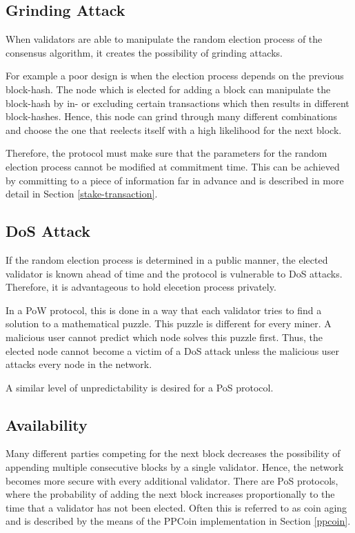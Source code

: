 \subsection{Grinding Attack}
When validators are able to manipulate the random election process of the consensus algorithm, it creates the possibility of grinding attacks. 

For example a poor design is when the election process depends on the previous block-hash. The node which is elected for adding a block can manipulate the block-hash by in- or excluding certain transactions which then results in different block-hashes. Hence, this node can grind through many different combinations and choose the one that reelects itself with a high likelihood for the next block.

Therefore, the protocol must make sure that the parameters for the random election process cannot be modified at commitment time. This can be achieved by committing to a piece of information far in advance and is described in more detail in Section \ref{stake-transaction}.

\subsection{DoS Attack}
If the random election process is determined in a public manner, the elected validator is known ahead of time and the protocol is vulnerable to DoS attacks. Therefore, it is advantageous to hold elecetion process privately. 

In a PoW protocol, this is done in a way that each validator tries to find a solution to a mathematical puzzle. This puzzle is different for every miner. A malicious user cannot predict which node solves this puzzle first. Thus, the elected node cannot become a victim of a DoS attack unless the malicious user attacks every node in the network.

A similar level of unpredictability is desired for a PoS protocol.

\subsection{Availability}
Many different parties competing for the next block decreases the possibility of appending multiple consecutive blocks by a single validator. Hence, the network becomes more secure with every additional validator. There are PoS protocols, where the probability of adding the next block increases proportionally to the time that a validator has not been elected. Often this is referred to as coin aging and is described by the means of the PPCoin implementation in Section \ref{ppcoin}. 

